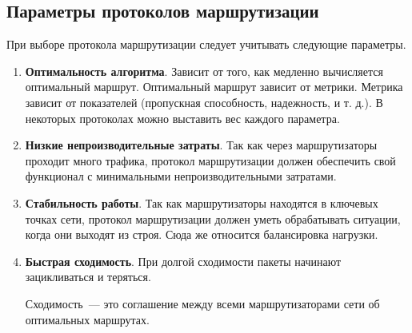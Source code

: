 \subsection{Параметры протоколов маршрутизации}

При выборе протокола маршрутизации следует учитывать следующие параметры.

\begin{enumerate}
    \item \textbf{Оптимальность алгоритма}. Зависит от того, как медленно вычисляется оптимальный маршрут. Оптимальный маршрут зависит от метрики. Метрика зависит от показателей (пропускная способность, надежность, и т. д.). В некоторых протоколах можно выставить вес каждого параметра.
    \item \textbf{Низкие непроизводительные затраты}. Так как через маршрутизаторы проходит много трафика, протокол маршрутизации должен обеспечить свой функционал с минимальными непроизводительными затратами.
    \item \textbf{Стабильность работы}. Так как маршрутизаторы находятся в ключевых точках сети, протокол маршрутизации должен уметь обрабатывать ситуации, когда они выходят из строя. Сюда же относится балансировка нагрузки.
    \item \textbf{Быстрая сходимость}. При долгой сходимости пакеты начинают зацикливаться и теряться.
          \begin{dd}
              Сходимость~--- это соглашение между всеми маршрутизаторами сети об оптимальных маршрутах.
          \end{dd}
\end{enumerate}
